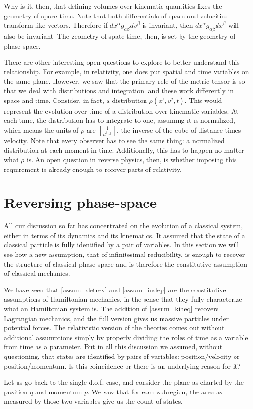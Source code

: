 Why is it, then, that defining volumes over kinematic quantities fixes the geometry of space time. Note that both differentials of space and velocities transform like vectors. Therefore if $dx^\alpha g_{\alpha\beta} dv^\beta$ is invariant, then $dx^\alpha g_{\alpha\beta} dx^\beta$ will also be invariant. The geometry of spate-time, then, is set by the geometry of phase-space.

There are other interesting open questions to explore to better understand this relationship. For example, in relativity, one does put spatial and time variables on the same plane. However, we saw that the primary role of the metric tensor is so that we deal with distributions and integration, and these work differently in space and time. Consider, in fact, a distribution $\rho(x^i, v^j, t)$. This would represent the evolution over time of a distribution over kinematic variables. At each time, the distribution has to integrate to one, assuming it is normalized, which means the units of $\rho$ are $\left[\frac{1}{d^3v^3}\right]$, the inverse of the cube of distance times velocity. Note that every observer has to see the same thing: a normalized distribution at each moment in time. Additionally, this has to happen no matter what $\rho$ is. An open question in reverse physics, then, is whether imposing this requirement is already enough to recover parts of relativity.

\section{Reversing phase-space}

All our discussion so far has concentrated on the evolution of a classical system, either in terms of its dynamics and its kinematics. It assumed that the state of a classical particle is fully identified by a pair of variables. In this section we will see how a new assumption, that of infinitesimal reducibility, is enough to recover the structure of classical phase space and is therefore the constitutive assumption of classical mechanics.

We have seen that \ref{assum_detrev} and \ref{assum_indep} are the constitutive assumptions of Hamiltonian mechanics, in the sense that they fully characterize what an Hamiltonian system is. The addition of \ref{assum_kineq} recovers Lagrangian mechanics, and the full version gives us massive particles under potential forces. The relativistic version of the theories comes out without additional assumptions simply by properly dividing the roles of time as a variable from time as a parameter. But in all this discussion we assumed, without questioning, that states are identified by pairs of variables: position/velocity or position/momentum. Is this coincidence or there is an underlying reason for it?

Let us go back to the single d.o.f. case, and consider the plane as charted by the position $q$ and momentum $p$. We saw that for each subregion, the area as measured by those two variables give us the count of states. 
